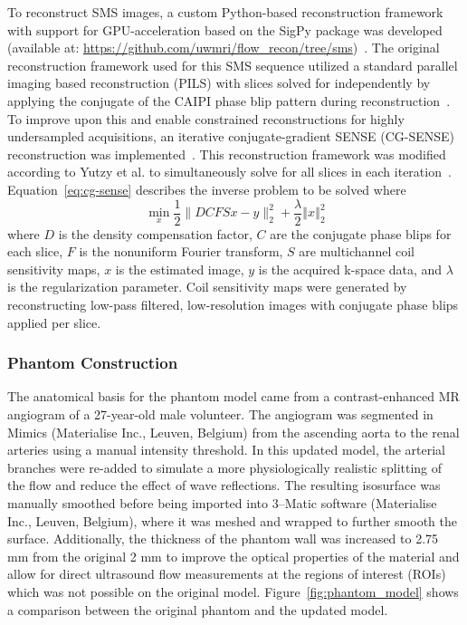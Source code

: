 To reconstruct SMS images, a custom Python-based reconstruction framework with support for GPU-acceleration based on the SigPy package was developed (available at: \url{https://github.com/uwmri/flow_recon/tree/sms})~\cite{ongSigpy}. The original reconstruction framework used for this SMS sequence utilized a standard parallel imaging based reconstruction (PILS) with slices solved for independently by applying the conjugate of the CAIPI phase blip pattern during reconstruction~\cite{griswoldPartiallyParallelImaging2000}. To improve upon this and enable constrained reconstructions for highly undersampled acquisitions, an iterative conjugate-gradient SENSE (CG-SENSE) reconstruction was implemented~\cite{pruessmann2001}. This reconstruction framework was modified according to Yutzy et al\@. to simultaneously solve for all slices in each iteration~\cite{yutzyImprovementsMultisliceParallel2011a}. Equation~\ref{eq:cg-sense} describes the inverse problem to be solved where  
\begin{equation}
    \min_x \frac{1}{2} \lVert DCFSx - y \rVert_2^2 + \frac{\lambda}{2}\left\Vert x \right\Vert_2^2
    \label{eq:cg-sense}
\end{equation}
where $D$ is the density compensation factor, $C$ are the conjugate phase blips for each slice, $F$ is the nonuniform Fourier transform, $S$ are multichannel coil sensitivity maps, $x$ is the estimated image, $y$ is the acquired k-space data, and $\lambda$ is the regularization parameter. Coil sensitivity maps were generated by reconstructing low-pass filtered, low-resolution images with conjugate phase blips applied per slice.

\subsubsection{Phantom Construction}
The anatomical basis for the phantom model came from a contrast-enhanced MR angiogram of a 27-year-old male volunteer. The angiogram was segmented in Mimics (Materialise Inc., Leuven, Belgium) from the ascending aorta to the renal arteries using a manual intensity threshold. In this updated model, the arterial branches were re-added to simulate a more physiologically realistic splitting of the flow and reduce the effect of wave reflections. The resulting isosurface was manually smoothed before being imported into 3--Matic software (Materialise Inc., Leuven, Belgium), where it was meshed and wrapped to further smooth the surface. Additionally, the thickness of the phantom wall was increased to 2.75 mm from the original 2 mm to improve the optical properties of the material and allow for direct ultrasound flow measurements at the regions of interest (ROIs) which was not possible on the original model. Figure~\ref{fig:phantom_model} shows a comparison between the original phantom and the updated model.

